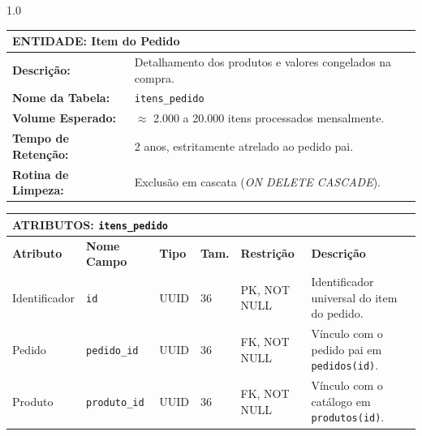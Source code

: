\documentclass[12pt,a4paper]{article}
\begin{document}
\begin{spacing}{1.0}

\small

\noindent

\begin{tabularx}{\textwidth}{|p{3.0cm}|X|}

\hline

\multicolumn{2}{|l|}{\textbf{ENTIDADE: Item do Pedido}} \\ \hline

\textbf{Descrição:} & Detalhamento dos produtos e valores congelados na compra. \\ \hline

\textbf{Nome da Tabela:} & \texttt{itens\_pedido} \\ \hline

\textbf{Volume Esperado:} & $\approx$ 2.000 a 20.000 itens processados mensalmente. \\ \hline

\textbf{Tempo de Retenção:} & 2 anos, estritamente atrelado ao pedido pai. \\ \hline

\textbf{Rotina de Limpeza:} & Exclusão em cascata (\textit{ON DELETE CASCADE}). \\ \hline

\end{tabularx}

\vspace{0.25cm}

\noindent

\begin{tabularx}{\textwidth}{|p{1.6cm}|p{1.9cm}|p{1.2cm}|p{0.7cm}|p{1.9cm}|X|}

\hline

\multicolumn{6}{|l|}{\textbf{ATRIBUTOS: \texttt{itens\_pedido}}} \\ \hline

\textbf{Atributo} & \textbf{Nome Campo} & \textbf{Tipo} & \textbf{Tam.} & \textbf{Restrição} & \textbf{Descrição} \\ \hline

Identificador & \texttt{id} & UUID & 36 & PK, NOT NULL & Identificador universal do item do pedido. \\ \hline

Pedido & \texttt{pedido\_id} & UUID & 36 & FK, NOT NULL & Vínculo com o pedido pai em \texttt{pedidos(id)}. \\ \hline

Produto & \texttt{produto\_id} & UUID & 36 & FK, NOT NULL & Vínculo com o catálogo em \texttt{produtos(id)}. \\ \hline


\end{tabularx}
\end{spacing}
\end{document}
